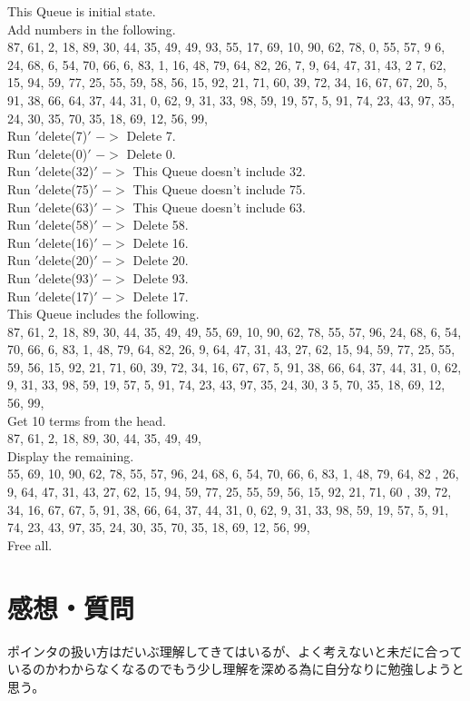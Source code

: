 \documentclass{jarticle}
\begin{document}
 This Queue is initial state.\\
Add numbers in the following.\\
87, 61, 2, 18, 89, 30, 44, 35, 49, 49, 93, 55, 17, 69, 10, 90, 62, 78, 0, 55, 57, 9
6, 24, 68, 6, 54, 70, 66, 6, 83, 1, 16, 48, 79, 64, 82, 26, 7, 9, 64, 47, 31, 43, 2
7, 62, 15, 94, 59, 77, 25, 55, 59, 58, 56, 15, 92, 21, 71, 60, 39, 72, 34, 16, 67,
67, 20, 5, 91, 38, 66, 64, 37, 44, 31, 0, 62, 9, 31, 33, 98, 59, 19, 57, 5, 91, 74, 23, 43, 97, 35, 24, 30, 35, 70, 35, 18, 69, 12, 56, 99,\\
Run $'$delete(7)$'$ $->$ Delete 7.\\
Run $'$delete(0)$'$ $->$ Delete 0.\\
Run $'$delete(32)$'$ $->$ This Queue doesn't include 32.\\
Run $'$delete(75)$'$ $->$ This Queue doesn't include 75.\\
Run $'$delete(63)$'$ $->$ This Queue doesn't include 63.\\
Run $'$delete(58)$'$ $->$ Delete 58.\\
Run $'$delete(16)$'$ $->$ Delete 16.\\
Run $'$delete(20)$'$ $->$ Delete 20.\\
Run $'$delete(93)$'$ $->$ Delete 93.\\
Run $'$delete(17)$'$ $->$ Delete 17.\\
This Queue includes the following.\\
87, 61, 2, 18, 89, 30, 44, 35, 49, 49, 55, 69, 10, 90, 62, 78, 55, 57, 96, 24, 68,
6, 54, 70, 66, 6, 83, 1, 48, 79, 64, 82, 26, 9, 64, 47, 31, 43, 27, 62, 15, 94, 59,
 77, 25, 55, 59, 56, 15, 92, 21, 71, 60, 39, 72, 34, 16, 67, 67, 5, 91, 38, 66, 64,
 37, 44, 31, 0, 62, 9, 31, 33, 98, 59, 19, 57, 5, 91, 74, 23, 43, 97, 35, 24, 30, 3
5, 70, 35, 18, 69, 12, 56, 99,\\
Get 10 terms from the head.\\
87, 61, 2, 18, 89, 30, 44, 35, 49, 49,\\
Display the remaining.\\
55, 69, 10, 90, 62, 78, 55, 57, 96, 24, 68, 6, 54, 70, 66, 6, 83, 1, 48, 79, 64, 82
, 26, 9, 64, 47, 31, 43, 27, 62, 15, 94, 59, 77, 25, 55, 59, 56, 15, 92, 21, 71, 60
, 39, 72, 34, 16, 67, 67, 5, 91, 38, 66, 64, 37, 44, 31, 0, 62, 9, 31, 33, 98, 59,
19, 57, 5, 91, 74, 23, 43, 97, 35, 24, 30, 35, 70, 35, 18, 69, 12, 56, 99,\\
Free all.\\

  
 \section{感想・質問}
 ポインタの扱い方はだいぶ理解してきてはいるが、よく考えないと未だに合っているのかわからなくなるのでもう少し理解を深める為に自分なりに勉強しようと思う。
 
\end{document}
